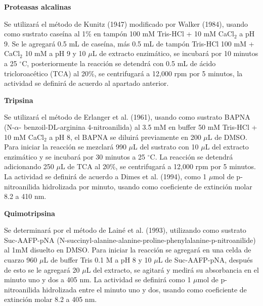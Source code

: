 \documentclass[12pt,a4paper]{article}
\begin{document}
\begin{multicols}{2}
\begin{Exercice}
\end{Exercice}

\begin{Exercice} \textbf{Proteasas alcalinas}
	
	Se utilizar\'a el método de Kunitz (1947) modificado por Walker (1984), usando como sustrato caseína al 1\% en tampón 100 mM Tris-HCl + 10 mM CaCl$_2$ a pH 9. Se le agregar\'a 0.5 mL de caseína, más 0.5 mL de tampón Tris-HCl 100 mM + CaCl$_2$ 10 mM a pH 9 y 10 $\mu$L de extracto enzimático, se incubar\'a por 10 minutos a 25 $^\circ$C, posteriormente la reacción se detendr\'a con 0.5 mL de \'acido tricloroacético (TCA) al 20\%, se centrifugar\'a a 12,000 rpm por 5 minutos, la actividad se definir\'a de acuerdo al apartado anterior.

\end{Exercice}

\begin{Exercice}\textbf{Tripsina}
	
	Se utilizar\'a el método de Erlanger et al. (1961), usando como sustrato BAPNA (N-$\alpha$- benzoil-DL-arginina 4-nitroanilida) al 3.5 mM en buffer 50 mM Tris-HCl + 10 mM CaCl$_2$ a pH 8, el BAPNA se diluir\'a previamente en 200 $\mu$L de DMSO. Para iniciar la reacción se mezclar\'a 990 $\mu$L del sustrato con 10 $\mu$L del extracto enzimático y se incubar\'a por 30 minutos a 25 $^\circ$C. La reacción se detendr\'a adicionando 250 $\mu$L de TCA al 20\%, se centrifugar\'a a 12,000 rpm por 5 minutos. La actividad se definir\'a de acuerdo a Dimes et al. (1994), como 1 $\mu$mol de p-nitroanilida hidrolizada por minuto, usando como coeficiente de extinción molar 8.2 a 410 nm.
	
\end{Exercice}

\begin{Exercice} \textbf{Quimotripsina}
	
	Se determinar\'a por el método de Lainé et al. (1993), utilizando como sustrato Suc-AAFP-pNA (N-succinyl-alanine-alanine-proline-phenylalanine-p-nitroanilide) al 1mM disuelto en DMSO. Para iniciar la reacción se agregar\'a en una celda de cuarzo 960 $\mu$L de buffer Tris 0.1 M a pH 8 y 10 $\mu$L de Suc-AAFP-pNA, despu\'es de esto se le agregar\'a 20 $\mu$L del extracto, se agitar\'a y medir\'a su absorbancia en el minuto uno y dos a 405 nm. La actividad se definir\'a como 1 $\mu$mol de p-nitroanilida hidrolizada entre el minuto uno y dos, usando como coeficiente de extinción molar 8.2 a 405 nm.
	

\end{Exercice}
\end{multicols}
\end{document}
